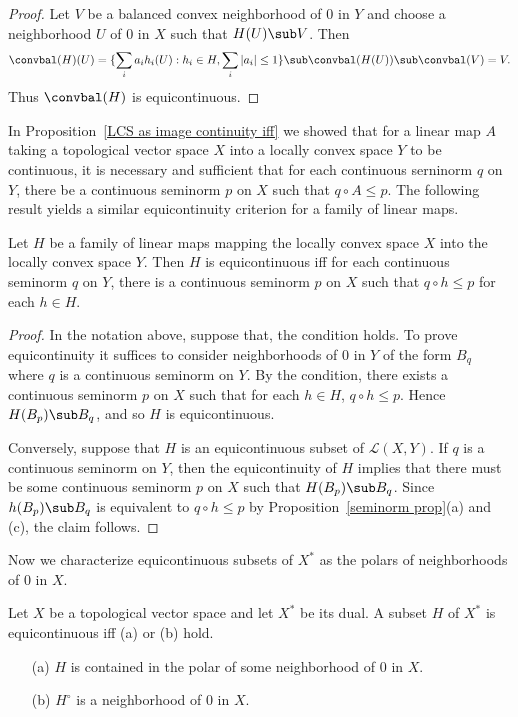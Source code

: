 \begin{proof}
Let $V$ be a balanced convex neighborhood of $0$ in $Y$ and choose a neighborhood $U$ of $0$ in $X$ such that $H(U)\sub V$. Then
\[\convbal(H)(U)=\{\sum_ia_ih_i(U):h_i\in H,\sum_i|a_i|\leq 1\}\sub\convbal(H(U))\sub\convbal(V)=V.\]
Thus $\convbal(H)$ is equicontinuous.
\end{proof}
In Proposition~\ref{LCS as image continuity iff} we showed that for a linear map $A$ taking a topological vector space $X$ into a locally convex space $Y$ to be continuous, it is necessary and sufficient that for each continuous serninorm $q$ on $Y$, there be a continuous seminorm $p$ on $X$ such that $q\circ A\leq p$. The following result yields a similar equicontinuity criterion for a family of linear maps.
\begin{proposition}\label{LCS equicontinuous iff}
Let $H$ be a family of linear maps mapping the locally convex space $X$ into the locally convex space $Y$. Then $H$ is equicontinuous iff for each continuous seminorm $q$ on $Y$, there is a continuous seminorm $p$ on $X$ such that $q\circ h\leq p$ for each $h\in H$.
\end{proposition}
\begin{proof}
In the notation above, suppose that, the condition holds. To prove equicontinuity it suffices to consider neighborhoods of $0$ in $Y$ of the form $B_q$ where $q$ is a continuous seminorm on $Y$. By the condition, there exists a continuous seminorm $p$ on $X$ such that for each $h\in H$, $q\circ h\leq p$. Hence $H(B_p)\sub B_q$, and so $H$ is equicontinuous.\par
Conversely, suppose that $H$ is an equicontinuous subset of $\mathcal{L}(X,Y)$. If $q$ is a continuous seminorm on $Y$, then the equicontinuity of $H$ implies that there must be some continuous seminorm $p$ on $X$ such that $H(B_p)\sub B_q$. Since $h(B_p)\sub B_q$ is equivalent to $q\circ h\leq p$ by Proposition~\ref{seminorm prop}(a) and (c), the claim follows.
\end{proof}
Now we characterize equicontinuous subsets of $X^*$ as the polars of neighborhoods of $0$ in $X$.
\begin{proposition}\label{equicontinuous iff polar is nbhd}
Let $X$ be a topological vector space and let $X^*$ be its dual. A subset $H$ of $X^*$ is equicontinuous iff (a) or (b) hold.
\begin{itemize}
\item[(a)] $H$ is contained in the polar of some neighborhood of $0$ in $X$.
\item[(b)] $H^\circ$ is a neighborhood of $0$ in $X$.
\end{itemize}
\end{proposition}

